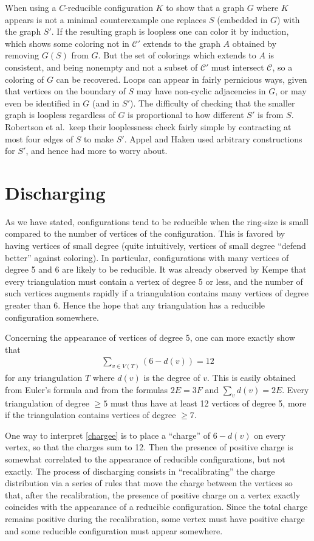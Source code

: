 \documentclass[11pt]{article}
\newcommand{\eqn}{\begin{eqnarray}}
\newcommand{\uneq}{\end{eqnarray}}
\newcommand{\mcal}{\mathcal}
\newcommand{\gA}{A}
\begin{document}
When using a $C$-reducible configuration $K$ to show that a graph $G$ where $K$ appears is not a minimal counterexample one replaces $S$ (embedded in $G$) with the graph $S'$. If the resulting graph is loopless one can color it by induction, which shows some coloring not in $\mcal{C}'$ extends to the graph $\gA$ obtained by removing $G(S)$ from $G$. But the set of colorings which extends to $\gA$ is consistent, and being nonempty and not a subset of $\mcal{C}'$ must intersect $\mcal{C}$, so a coloring of $G$ can be recovered. 
Loops can appear in fairly pernicious ways, given that vertices on the boundary of $S$ may have non-cyclic adjacencies in $G$, or may even be identified in $G$ (and in $S'$). The difficulty of checking that the smaller graph is loopless regardless of $G$ is proportional to how different $S'$ is from $S$. Robertson et al.~keep their looplessness check fairly simple by contracting at most four edges of $S$ to make $S'$. Appel and Haken used arbitrary constructions for $S'$, and hence had more to worry about.

\section{Discharging}

As we have stated, configurations tend to be reducible when the ring-size is small compared to the number of vertices of the configuration. 
This is favored by having vertices of small degree (quite intuitively, vertices of small degree ``defend better'' against coloring). In particular, configurations with many vertices of degree 5 and 6 are likely to be reducible. It was already observed by Kempe \cite{kempe} that every triangulation must contain a vertex of degree 5 or less, and the number of such vertices augments rapidly if a triangulation contains many vertices of degree greater than 6. Hence the hope that any triangulation has a reducible configuration somewhere.

Concerning the appearance of vertices of degree 5, one can more exactly show that
\eqn
\label{chargee}
\sum_{v\in V(T)} (6 - d(v)) = 12
\uneq
for any triangulation $T$ where $d(v)$ is the degree of $v$. This is easily obtained from Euler's formula and from the formulas $2E = 3F$ and $\sum_v d(v) = 2E$. Every triangulation of degree $\geq 5$ must thus have at least 12 vertices of degree 5, more if the triangulation contains vertices of degree $\geq 7$. 

One way to interpret \eqref{chargee} is to place a ``charge'' of $6 - d(v)$ on every vertex, so that the charges sum to 12. Then the presence of positive charge is somewhat correlated to the appearance of reducible configurations, but not exactly. The process of discharging consists in ``recalibrating'' the charge distribution via a series of rules that move the charge between the vertices so that, after the recalibration, the presence of positive charge on a vertex exactly coincides with the appearance of a reducible configuration. 
Since the total charge remains positive during the recalibration, some vertex must have positive charge and some reducible configuration must appear somewhere. 
\end{document}
